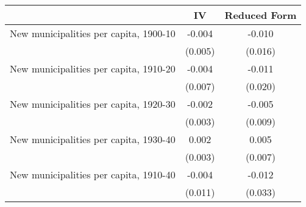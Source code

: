  \begin{tabular}{l*{2}{c}} \toprule
                &\multicolumn{1}{c}{IV}&\multicolumn{1}{c}{Reduced Form}\\
\midrule
New municipalities per capita, 1900-10&   -0.004   &   -0.010   \\
                &  (0.005)   &  (0.016)   \\
\addlinespace
New municipalities per capita, 1910-20&   -0.004   &   -0.011   \\
                &  (0.007)   &  (0.020)   \\
\addlinespace
New municipalities per capita, 1920-30&   -0.002   &   -0.005   \\
                &  (0.003)   &  (0.009)   \\
\addlinespace
New municipalities per capita, 1930-40&    0.002   &    0.005   \\
                &  (0.003)   &  (0.007)   \\
\addlinespace
New municipalities per capita, 1910-40&   -0.004   &   -0.012   \\
                &  (0.011)   &  (0.033)   \\
       \bottomrule \end{tabular}
